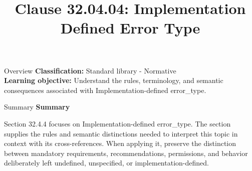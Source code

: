 \documentclass[10pt,letterpaper]{article}
\title{Clause 32.04.04: Implementation Defined Error Type}
\author{}
\date{}
\begin{document}
\maketitle
\begin{CornellOverviewBox}{Overview}
\textbf{Classification:} Standard library - Normative\\[2pt]
\textbf{Learning objective:} Understand the rules, terminology, and semantic consequences associated with Implementation-defined error\_type.
\end{CornellOverviewBox}\begin{CornellSummaryBox}{Summary}
{\sffamily\bfseries\color{Accent} Summary}\par\vspace{3pt}Section 32.4.4 focuses on Implementation-defined error\_type. The section supplies the rules and semantic distinctions needed to interpret this topic in context with its cross-references. When applying it, preserve the distinction between mandatory requirements, recommendations, permissions, and behavior deliberately left undefined, unspecified, or implementation-defined.
\end{CornellSummaryBox}
\end{document}
